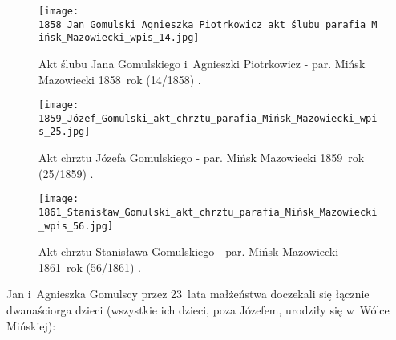 \begin{figure}[!ht]
    \vspace*{0.5cm}
    \centering \texttt{[image: 
        1858\_Jan\_Gomulski\_Agnieszka\_Piotrkowicz\_akt\_ślubu\_parafia\_Mińsk\_Mazowiecki\_wpis\_14.jpg]}
    \captionsetup{format=hang}
    \caption{Akt ślubu Jana Gomulskiego i~Agnieszki Piotrkowicz - par. 
    Mińsk Mazowiecki 1858~rok (14/1858) \cite{par_minsk2}.}
    \label{fig:jgomulski_1858}
\end{figure}

\begin{figure}[!ht]
    \vspace*{0.5cm}
    \centering \texttt{[image: 
        1859\_Józef\_Gomulski\_akt\_chrztu\_parafia\_Mińsk\_Mazowiecki\_wpis\_25.jpg]}
    \captionsetup{format=hang}
    \caption{Akt chrztu Józefa Gomulskiego - par. Mińsk Mazowiecki 
    1859~rok (25/1859) 
    \cite{par_minsk2}.}
    \label{fig:jgomulski_1859}
\end{figure}

\begin{figure}[!ht]
    \vspace*{0.5cm}
    \centering \texttt{[image: 
        1861\_Stanisław\_Gomulski\_akt\_chrztu\_parafia\_Mińsk\_Mazowiecki\_wpis\_56.jpg]}
    \captionsetup{format=hang}
    \caption{Akt chrztu Stanisława Gomulskiego - par. Mińsk Mazowiecki 
    1861~rok (56/1861) 
    \cite{par_minsk2}.}
    \label{fig:sgomulski_1861}
\end{figure}

Jan i~Agnieszka Gomulscy przez 23~lata małżeństwa doczekali się łącznie
dwanaściorga dzieci (wszystkie ich dzieci, poza Józefem, urodziły się w~Wólce
Mińskiej):


